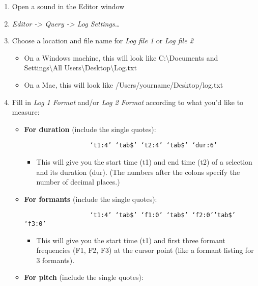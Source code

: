 \begin{enumerate}
\def\labelenumi{\arabic{enumi}.}
\item
  Open a sound in the Editor window
\item
  \emph{Editor -\textgreater{} Query -\textgreater{} Log
  Settings\ldots{}}
\item
  Choose a location and file name for \emph{Log file 1} or \emph{Log
  file 2}

  \begin{itemize}
  \tightlist
  \item
    On a Windows machine, this will look like C:\textbackslash Documents
    and Settings\textbackslash All
    Users\textbackslash Desktop\textbackslash Log.txt
  \item
    On a Mac, this will look like /Users/yourname/Desktop/log.txt
  \end{itemize}
\item
  Fill in \emph{Log 1 Format} and/or \emph{Log 2 Format} according to
  what you'd like to measure:

  \begin{itemize}
  \tightlist
  \item
    \textbf{For duration} (include the single quotes):

    \begin{verbatim}
                  ‘t1:4’ ‘tab$’ ‘t2:4’ ‘tab$’ ‘dur:6’
              \end{verbatim}

    \begin{itemize}
    \tightlist
    \item
      This will give you the start time (t1) and end time (t2) of a
      selection and its duration (dur). (The numbers after the colons
      specify the number of decimal places.)
    \end{itemize}
  \item
    \textbf{For formants} (include the single quotes):

    \begin{verbatim}
                  ‘t1:4’ ‘tab$’ ‘f1:0’ ‘tab$’ ‘f2:0’’tab$’ ‘f3:0’
              \end{verbatim}

    \begin{itemize}
    \tightlist
    \item
      This will give you the start time (t1) and first three formant
      frequencies (F1, F2, F3) at the cursor point (like a formant
      listing for 3 formants).
    \end{itemize}
  \item
    \textbf{For pitch} (include the single quotes):


\end{itemize}
\end{enumerate}
